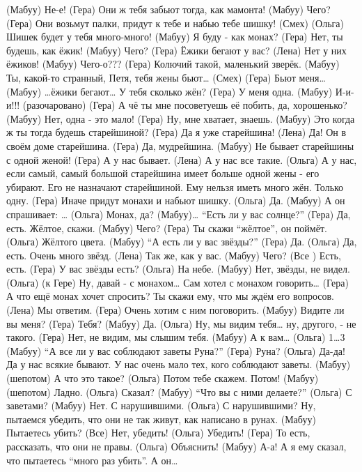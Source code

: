  (Мабуу) Не-е!
 (Гера)  Они ж тебя забьют тогда, как мамонта!
 (Мабуу) Чего?
 (Гера)  Они возьмут палки,  придут к тебе и набью тебе шишку! 
 (Смех) 
 (Ольга) Шишек будет у тебя много-много!
 (Мабуу) Я буду - как монах? 
 (Гера)  Нет, ты будешь, как ёжик!
 (Мабуу) Чего?
 (Гера)  Ёжики бегают у вас?
 (Лена)  Нет у них ёжиков!
 (Мабуу) Чего-о???
 (Гера)  Колючий такой, маленький зверёк.
 (Мабуу) Ты, какой-то странный, Петя, тебя жены бьют…
 (Смех)
 (Гера)  Бьют меня…
 (Мабуу) …ёжики бегают… У тебя сколько жён? 
 (Гера)  У меня одна. 
 (Мабуу) И-и-и!!! (разочаровано)
 (Гера)  А чё ты мне посоветуешь её побить, да, хорошенько? 
 (Мабуу) Нет, одна - это мало!
 (Гера)  Ну, мне хватает, знаешь. 
 (Мабуу) Это когда ж ты тогда будешь старейшиной? 
 (Гера)  Да я уже старейшина!
 (Лена)  Да! Он в своём доме старейшина.
 (Гера)  Да, мудрейшина. 
 (Мабуу) Не бывает старейшины с одной женой!
 (Гера)  А у нас бывает.
 (Лена)  А у нас все такие.
 (Ольга) А у нас, если самый, самый большой старейшина имеет больше одной жены - его убирают. Его не назначают старейшиной. Ему нельзя иметь много жён. Только одну.
 (Гера)  Иначе придут монахи и набьют шишку.  
 (Ольга) Да. 
 (Мабуу) А он спрашивает: …
 (Ольга) Монах, да? 
 (Мабуу)… ``Есть ли у вас солнце?''
 (Гера)  Да, есть. Жёлтое, скажи.
 (Мабуу) Чего?
 (Гера)  Ты скажи ``жёлтое'', он поймёт. 
 (Ольга) Жёлтого цвета. 
 (Мабуу) ``А есть ли у вас звёзды?''
 (Гера)  Да. 
 (Ольга) Да, есть. Очень много звёзд. 
 (Лена)  Так же, как у вас. 
 (Мабуу) Чего?
 (Все )  Есть, есть.
 (Гера)  У вас звёзды есть?
 (Ольга) На небе. 
 (Мабуу) Нет, звёзды, не видел. 
 (Ольга) (к Гере)  Ну, давай - с монахом… Сам хотел с монахом говорить…
 (Гера)  А что ещё монах хочет спросить? Ты скажи ему, что мы ждём его вопросов.
 (Лена)  Мы ответим. 
 (Гера)  Очень хотим с ним поговорить.
 (Мабуу) Видите ли вы меня? 
 (Гера)  Тебя? 
 (Мабуу) Да. 
 (Ольга) Ну, мы видим тебя… ну, другого, - не такого. 
 (Гера)  Нет, не видим, мы слышим тебя. 
 (Мабуу) А к вам…
 (Ольга) 1…3
 (Мабуу)  ``А  все ли у вас соблюдают заветы Руна?''
 (Гера)   Руна?
 (Ольга)  Да-да! Да у нас всякие бывают. У нас очень мало тех, кого соблюдают заветы. 
 (Мабуу) (шепотом) А что это такое?
 (Ольга)  Потом тебе скажем. Потом!
 (Мабуу) (шепотом) Ладно. 
 (Ольга)  Сказал? 
 (Мабуу) ``Что вы с ними делаете?''
 (Ольга)  С заветами? 
 (Мабуу) Нет. С нарушившими. 
 (Ольга) С нарушившими? Ну, пытаемся убедить, что они не так живут, как написано в рунах.  
 (Мабуу) Пытаетесь убить?
 (Все)   Нет, убедить!
 (Ольга) Убедить!
 (Гера)  То есть, рассказать, что они не правы. 
 (Ольга) Объяснить!
 (Мабуу) А-а! А я ему сказал, что пытаетесь ``много раз убить''. А он…

